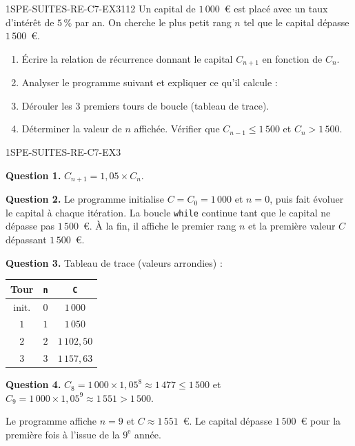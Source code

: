 \begin{exercice}{1SPE-SUITES-RE-C7-EX3}{1}{12}
Un capital de $1\,000$~€ est placé avec un taux d'intérêt de $5\,\%$ par an. On cherche le plus petit rang $n$ tel que le capital dépasse $1\,500$~€.
\begin{enumerate}
  \item Écrire la relation de récurrence donnant le capital $C_{n+1}$ en fonction de $C_n$.
  \item Analyser le programme suivant et expliquer ce qu'il calcule :

\medskip


  \item Dérouler les $3$ premiers tours de boucle (tableau de trace).
  \item Déterminer la valeur de $n$ affichée. Vérifier que $C_{n-1} \leq 1\,500$ et $C_n > 1\,500$.
\end{enumerate}
\end{exercice}


\begin{corrige}{1SPE-SUITES-RE-C7-EX3}

\textbf{Question 1.} $C_{n+1} = 1{,}05 \times C_n$.

\textbf{Question 2.} Le programme initialise $C = C_0 = 1\,000$ et $n = 0$, puis fait évoluer le capital à chaque itération. La boucle \texttt{while} continue tant que le capital ne dépasse pas $1\,500$~€. À la fin, il affiche le premier rang $n$ et la première valeur $C$ dépassant $1\,500$~€.

\textbf{Question 3.} Tableau de trace (valeurs arrondies) :

\begin{center}
\begin{tabular}{|c|c|c|}
\hline
Tour & \texttt{n} & \texttt{C} \\
\hline
init. & $0$ & $1\,000$ \\
$1$ & $1$ & $1\,050$ \\
$2$ & $2$ & $1\,102{,}50$ \\
$3$ & $3$ & $1\,157{,}63$ \\
\hline
\end{tabular}
\end{center}

\textbf{Question 4.} $C_8 = 1\,000 \times 1{,}05^8 \approx 1\,477 \leq 1\,500$ et $C_9 = 1\,000 \times 1{,}05^9 \approx 1\,551 > 1\,500$.

Le programme affiche $n = 9$ et $C \approx 1\,551$~€. Le capital dépasse $1\,500$~€ pour la première fois à l'issue de la $9^{\text{e}}$ année.

\end{corrige}
